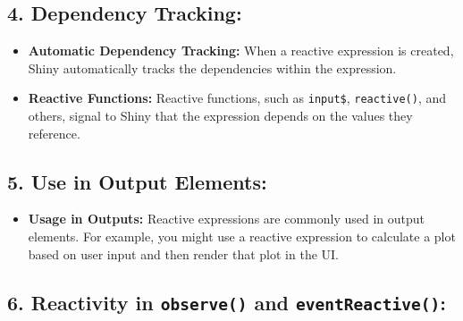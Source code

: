 \documentclass[
]{book}
\newenvironment{Shaded}{\begin{snugshade}}{\end{snugshade}}
\newcommand{\FunctionTok}[1]{\textcolor[rgb]{0.13,0.29,0.53}{\textbf{#1}}}
\newcommand{\NormalTok}[1]{#1}
\newcommand{\OtherTok}[1]{\textcolor[rgb]{0.56,0.35,0.01}{#1}}
\newcommand{\SpecialCharTok}[1]{\textcolor[rgb]{0.81,0.36,0.00}{\textbf{#1}}}
\providecommand{\tightlist}{%
  \setlength{\itemsep}{0pt}\setlength{\parskip}{0pt}}
\begin{document}
\hypertarget{dependency-tracking}{%
\subsection{\texorpdfstring{4. \textbf{Dependency Tracking:}}{4. Dependency Tracking:}}\label{dependency-tracking}}

\begin{itemize}
\tightlist
\item
  \textbf{Automatic Dependency Tracking:} When a reactive expression is created, Shiny automatically tracks the dependencies within the expression.
\item
  \textbf{Reactive Functions:} Reactive functions, such as \texttt{input\$}, \texttt{reactive()}, and others, signal to Shiny that the expression depends on the values they reference.
\end{itemize}

\hypertarget{use-in-output-elements}{%
\subsection{\texorpdfstring{5. \textbf{Use in Output Elements:}}{5. Use in Output Elements:}}\label{use-in-output-elements}}

\begin{itemize}
\tightlist
\item
  \textbf{Usage in Outputs:} Reactive expressions are commonly used in output elements. For example, you might use a reactive expression to calculate a plot based on user input and then render that plot in the UI.
\end{itemize}

\begin{Shaded}
\end{Shaded}

\hypertarget{reactivity-in-observe-and-eventreactive}{%
\subsection{\texorpdfstring{6. \textbf{Reactivity in \texttt{observe()} and \texttt{eventReactive()}:}}{6. Reactivity in observe() and eventReactive():}}\label{reactivity-in-observe-and-eventreactive}}
\end{document}
